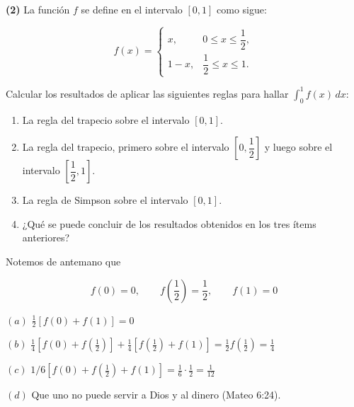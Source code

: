 \documentclass[12pt]{article}
\begin{document}
\pagebreak 

\begin{myframe}
    \textbf{(2)} La función $f$ se define en el intervalo $[0,1]$ como sigue:
    
    \[
    f(x)=
    \begin{cases}
        x, & 0 \le x \le \dfrac{1}{2},\\[6pt]
        1-x, & \dfrac{1}{2} \le x \le 1.
    \end{cases}
    \]
    
    Calcular los resultados de aplicar las siguientes reglas para hallar
    $\displaystyle \int_0^1 f(x)\,dx$:
    
    \begin{enumerate}
        \item[(a)] La regla del trapecio sobre el intervalo $[0,1]$.
        
        \item[(b)] La regla del trapecio, primero sobre el intervalo
        $\left[0,\dfrac{1}{2}\right]$ y luego sobre el intervalo
        $\left[\dfrac{1}{2},1\right]$.
        
        \item[(c)] La regla de Simpson sobre el intervalo $[0,1]$.
        
        \item[(d)] ¿Qué se puede concluir de los resultados obtenidos en los tres ítems anteriores?
    \end{enumerate}
\end{myframe}

Notemos de antemano que

\begin{equation*}
    f(0) = 0, \qquad f\left( \frac{1}{2} \right) = \frac{1}{2}, \qquad f(1) = 0
\end{equation*}

$(a)$ $\frac{1}{2} \left[ f(0) + f(1) \right] = 0$

$(b)$ $\frac{1}{4}\left[ f(0) + f\left( \frac{1}{2} \right)  \right] +
\frac{1}{4} \left[ f\left( \frac{1}{2} \right) + f(1) \right] = \frac{1}{2} 
f\left( \frac{1}{2} \right) = \frac{1}{4}$

$(c)$ $1 / 6 \left[ f(0) + f\left( \frac{1}{2} \right) + f(1)  \right]  =
\frac{1}{6} \cdot \frac{1}{2} = \frac{1}{12}$

$(d)$ Que uno no puede servir a Dios y al dinero (Mateo 6:24).

\pagebreak 
\end{document}
